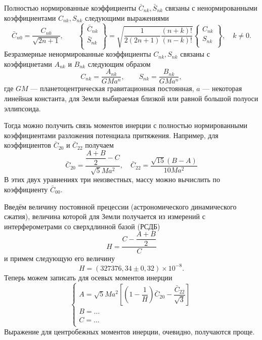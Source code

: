 \documentclass[11pt, a4paper,addpoints]{exam}
\theoremstyle{remark}
\begin{document}
    Полностью нормированные коэффициенты $\bar{C}_{nk}, \bar{S}_{nk}$ связаны с ненормированными
    коэффициентами $C_{nk}, S_{nk}$ следующими выражениями
    \begin{equation*}
        \bar{C}_{n0} = \dfrac{C_{n0}}{\sqrt{2n+1}}, \qquad
        \begin{Bmatrix}
            \bar{C}_{nk} \\
            \bar{S}_{nk} \\
        \end{Bmatrix}  =
    \sqrt{\dfrac{1}{2(2n + 1)}\dfrac{(n + k)!}{(n-k)!}}
        \begin{Bmatrix}
            C_{nk} \\
            S_{nk} \\
        \end{Bmatrix},
        \quad k \neq 0.
    \end{equation*}
    Безразмерные ненормированные коэффициенты $C_{nk}, S_{nk}$ связаны с коэффицнетами $A_{nk}$ и
    $B_{nk}$ следующим образом
    \begin{equation*}
        C_{nk} = \dfrac{A_{nk}}{GMa^n}, \qquad
        S_{nk} = \dfrac{B_{nk}}{GMa^n},
    \end{equation*}
    где $GM$ --- планетоцентрическая гравитационная постоянная, $a$ --- некоторая линейная
    константа, для Земли выбираемая близкой или равной большой полуоси эллипсоида.

    Тогда можно получить связь моментов инерции с полностью нормированными коэффициентами разложения
    потенциала притяжения. Например, для коэффициентов $\bar{C}_{20}$ и $\bar{C}_{22}$ получаем
    \begin{equation}
        \label{eq:c20c22}
        \bar{C}_{20} = \dfrac{\dfrac{A + B}{2} - C}{\sqrt{5}Ma^2},\quad
        \bar{C}_{22} = \dfrac{\sqrt{15}\left( B - A \right)}{10 M a^2}
    \end{equation}
    В этих двух уравнениях три неизвестных, массу можно
    вычислить по коэффициенту $\bar{C}_{00}$.

    Введём величину постоянной прецессии (астрономического динамического сжатия), величина которой
    для Земли получается из измерений с интерферометрами со сверхдлинной базой (РСДБ)
    \begin{equation*}
        \label{eq:H}
        H = \dfrac{C - \dfrac{A + B}{2}}{C}
    \end{equation*}
    и примем следующую его величину
    \begin{equation*}
        H = (327376,34 \pm 0,32) \times 10^{-8}.
    \end{equation*}
    Теперь можем записать для осевых моментов инерции
    \begin{equation*}
    \begin{cases} 
        A = \sqrt{5} Ma^2 \left[ \left( 1 - \dfrac{1}{H} \right)\bar{C}_{20} -
        \dfrac{\bar{C}_{22}}{\sqrt{3}} \right] \\
        B = \dots \\
        C = \dots \\
    \end{cases}
    \end{equation*}
    Выражение для центробежных моментов инерции, очевидно, получаются проще.
\end{document}
